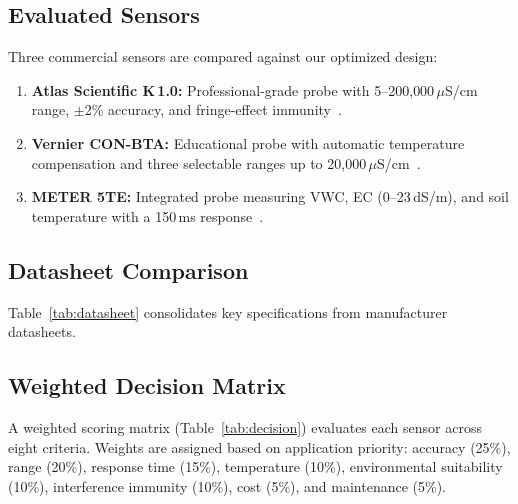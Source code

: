 \documentclass[conference]{IEEEtran}
\begin{document}
\subsection{Evaluated Sensors}
Three commercial sensors are compared against our optimized design:
\begin{enumerate}
\item \textbf{Atlas Scientific K\,1.0:} Professional-grade probe with 5--200{,}000\,$\mu$S/cm range, $\pm$2\% accuracy, and fringe-effect immunity~\cite{atlas2023}.
\item \textbf{Vernier CON-BTA:} Educational probe with automatic temperature compensation and three selectable ranges up to 20{,}000\,$\mu$S/cm~\cite{vernier2025}.
\item \textbf{METER 5TE:} Integrated probe measuring VWC, EC (0--23\,dS/m), and soil temperature with a 150\,ms response~\cite{meter2018}.
\end{enumerate}

\subsection{Datasheet Comparison}
Table~\ref{tab:datasheet} consolidates key specifications from manufacturer datasheets.

\begin{table}[H]
\centering
\caption{Commercial Sensor Specifications Comparison}
\label{tab:datasheet}
\end{table}

\subsection{Weighted Decision Matrix}
A weighted scoring matrix (Table~\ref{tab:decision}) evaluates each sensor across eight criteria. Weights are assigned based on application priority: accuracy (25\%), range (20\%), response time (15\%), temperature (10\%), environmental suitability (10\%), interference immunity (10\%), cost (5\%), and maintenance (5\%).
\end{document}
